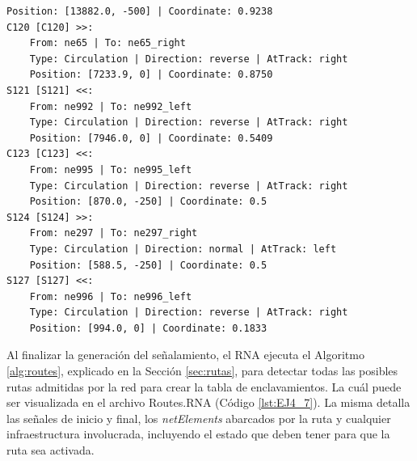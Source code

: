 \begin{lstlisting}[language = {}, tabsize=4, basicstyle=\footnotesize\ttfamily, showspaces=false, showstringspaces=false, caption = Signalling.RNA, label = {lst:EJ4_6}]
	Position: [13882.0, -500] | Coordinate: 0.9238
C120 [C120] >>:
	From: ne65 | To: ne65_right
	Type: Circulation | Direction: reverse | AtTrack: right 
	Position: [7233.9, 0] | Coordinate: 0.8750
S121 [S121] <<:
	From: ne992 | To: ne992_left
	Type: Circulation | Direction: reverse | AtTrack: right 
	Position: [7946.0, 0] | Coordinate: 0.5409
C123 [C123] <<:
	From: ne995 | To: ne995_left
	Type: Circulation | Direction: reverse | AtTrack: right 
	Position: [870.0, -250] | Coordinate: 0.5
S124 [S124] >>:
	From: ne297 | To: ne297_right
	Type: Circulation | Direction: normal | AtTrack: left 
	Position: [588.5, -250] | Coordinate: 0.5
S127 [S127] <<:
	From: ne996 | To: ne996_left
	Type: Circulation | Direction: reverse | AtTrack: right 
	Position: [994.0, 0] | Coordinate: 0.1833
	\end{lstlisting}	
	
	Al finalizar la generación del señalamiento, el RNA ejecuta el Algoritmo \ref{alg:routes}, explicado en la Sección \ref{sec:rutas}, para detectar todas las posibles rutas admitidas por la red para crear la tabla de enclavamientos. La cuál puede ser visualizada en el archivo Routes.RNA (Código \ref{lst:EJ4_7}). La misma detalla las señales de inicio y final, los \textit{netElements} abarcados por la ruta y cualquier infraestructura involucrada, incluyendo el estado que deben tener para que la ruta sea activada.
	
